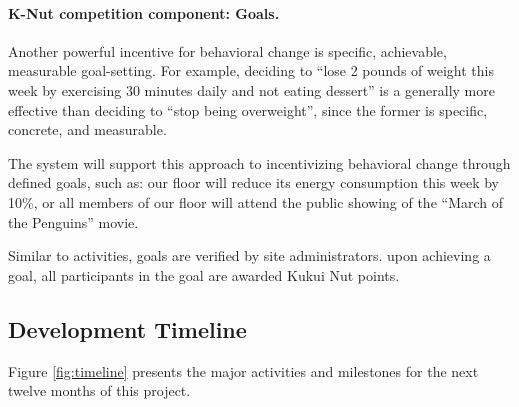 \documentclass[11pt]{article}
\begin{document}
\paragraph{K-Nut competition component: Goals.}  Another powerful incentive
for behavioral change is specific, achievable, measurable goal-setting.
For example, deciding to ``lose 2 pounds of weight this week by exercising
30 minutes daily and not eating dessert'' is a generally more effective
than deciding to ``stop being overweight'', since the former is specific,
concrete, and measurable.  

The system will support this approach to incentivizing behavioral change
through defined goals, such as: our floor will reduce its energy
consumption this week by 10\%, or all members of our floor will attend the
public showing of the ``March of the Penguins'' movie.  

Similar to activities, goals are verified by site administrators.  upon
achieving a goal, all participants in the goal are awarded Kukui Nut
points.  


\subsection{Development Timeline}

Figure \ref{fig:timeline} presents the major activities and milestones  for the next twelve months of this project.
\end{document}
